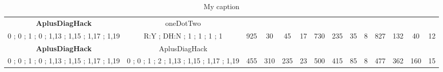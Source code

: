 \begin{table}[]
{\begin{tabular}{|c|c|c|c|c|c|c|c|c|c|c|c|c|c|}
\cellcolor{blue!15}\textbf{AplusDiagHack} & oneDotTwo& {\color[HTML]{00009B} } & {\color[HTML]{9A0000} } & {\color[HTML]{009901} } &  & {\color[HTML]{00009B} } & {\color[HTML]{9A0000} } & {\color[HTML]{009901} } &  & {\color[HTML]{00009B} } & {\color[HTML]{9A0000} } & {\color[HTML]{009901} } &  \\ 
\cellcolor{ blue!15}0 ; 0 ; 1 ; 0 ; 1,13 ; 1,15 ; 1,17 ; 1,19 & R:Y ; DH:N ; 1 ; 1 ; 1 ; 1 & \multirow{-2}{*}{{\color[HTML]{00009B} 925}} & \multirow{-2}{*}{{\color[HTML]{9A0000} 30}} & \multirow{-2}{*}{{\color[HTML]{009901} 45}} & \multirow{-2}{*}{17} & \multirow{-2}{*}{{\color[HTML]{00009B} 730}} & \multirow{-2}{*}{{\color[HTML]{9A0000} 235}} & \multirow{-2}{*}{{\color[HTML]{009901} 35}} & \multirow{-2}{*}{8} & \multirow{-2}{*}{{\color[HTML]{00009B} 827}} & \multirow{-2}{*}{{\color[HTML]{9A0000} 132}} & \multirow{-2}{*}{{\color[HTML]{009901} 40}} & \multirow{-2}{*}{12} \\ \hline

\cellcolor{blue!15}\textbf{AplusDiagHack} & AplusDiagHack& {\color[HTML]{00009B} } & {\color[HTML]{9A0000} } & {\color[HTML]{009901} } &  & {\color[HTML]{00009B} } & {\color[HTML]{9A0000} } & {\color[HTML]{009901} } &  & {\color[HTML]{00009B} } & {\color[HTML]{9A0000} } & {\color[HTML]{009901} } &  \\ 
\cellcolor{ blue!15}0 ; 0 ; 1 ; 0 ; 1,13 ; 1,15 ; 1,17 ; 1,19 & 0 ; 0 ; 1 ; 2 ; 1,13 ; 1,15 ; 1,17 ; 1,19 & \multirow{-2}{*}{{\color[HTML]{00009B} 455}} & \multirow{-2}{*}{{\color[HTML]{9A0000} 310}} & \multirow{-2}{*}{{\color[HTML]{009901} 235}} & \multirow{-2}{*}{23} & \multirow{-2}{*}{{\color[HTML]{00009B} 500}} & \multirow{-2}{*}{{\color[HTML]{9A0000} 415}} & \multirow{-2}{*}{{\color[HTML]{009901} 85}} & \multirow{-2}{*}{8} & \multirow{-2}{*}{{\color[HTML]{00009B} 477}} & \multirow{-2}{*}{{\color[HTML]{9A0000} 362}} & \multirow{-2}{*}{{\color[HTML]{009901} 160}} & \multirow{-2}{*}{15} \\ \hline
\end{tabular}} \caption{ My caption} \label{ my - label} \end{table}
